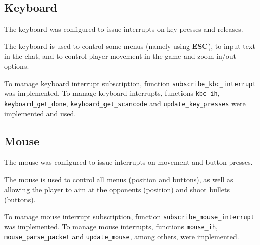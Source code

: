 \documentclass{article}
\theoremstyle{remark}
\begin{document}
\subsection{Keyboard}
The keyboard was configured to issue interrupts on key presses and releases. \par
The keyboard is used to control some menus (namely using \textbf{ESC}), to input text in the chat, and to control player movement in the game and zoom in/out options.\par
To manage keyboard interrupt subscription, function \texttt{subscribe\_kbc\_interrupt} was implemented. To manage keyboard interrupts, functions \texttt{kbc\_ih}, \texttt{keyboard\_get\_done}, \texttt{keyboard\_get\_scancode} and \texttt{update\_key\_presses} were implemented and used. 
\subsection{Mouse}
The mouse was configured to issue interrupts on movement and button presses. \par
The mouse is used to control all menus (position and buttons), as well as allowing the player to aim at the opponents (position) and shoot bullets (buttons). \par
To manage mouse interrupt subscription, function \texttt{subscribe\_mouse\_interrupt} was implemented. To manage mouse interrupts, functions \texttt{mouse\_ih}, \texttt{mouse\_parse\_packet} and \texttt{update\_mouse}, among others, were implemented.
\end{document}
